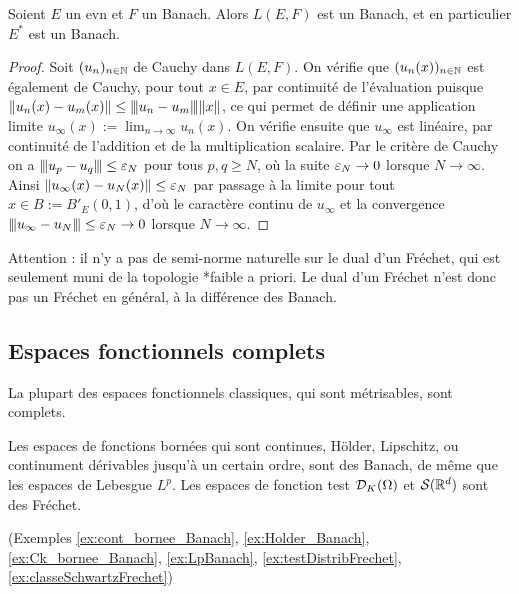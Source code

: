 \begin{proposition}
\label{prop:LEFcomplet}
%
Soient $E$ un evn et $F$ un Banach. Alors $L(E,F)$ est un Banach, et en particulier $E^*$ est un Banach. 	
\end{proposition}

\begin{proof}
	Soit $(u_n)_{n \in \mathbb{N}}$ de Cauchy dans $L(E,F)$. On vérifie que $(u_n(x))_{n \in \mathbb{N}}$ est également de Cauchy, pour tout $x \in E$, par continuité de l'évaluation puisque 
$\|u_n(x)-u_m(x)\| \leq {\left\vert\kern-0.25ex\left\vert\kern-0.25ex\left\vert u_n-u_m \right\vert\kern-0.25ex\right\vert\kern-0.25ex\right\vert} \|x\|$, 
	ce qui permet de définir une application limite $u_\infty(x) := \lim_{n\to \infty} u_n(x)$. On vérifie ensuite que $u_\infty$ est linéaire, par continuité de l'addition et de la multiplication scalaire. Par le critère de Cauchy on a ${\left\vert\kern-0.25ex\left\vert\kern-0.25ex\left\vert u_p-u_q \right\vert\kern-0.25ex\right\vert\kern-0.25ex\right\vert}\leq \varepsilon_N$ pour tous $p,q\geq N$, où la suite $\varepsilon_N \to 0$ lorsque $N \to \infty$. Ainsi $\|u_\infty(x)-u_N(x)\| \leq \varepsilon_N$ par passage à la limite pour tout $x \in B := B'_E(0,1)$, d'où le caractère continu de $u_\infty$ et la convergence ${\left\vert\kern-0.25ex\left\vert\kern-0.25ex\left\vert u_\infty-u_N \right\vert\kern-0.25ex\right\vert\kern-0.25ex\right\vert} \leq \varepsilon_N \to 0$ lorsque $N \to \infty$.
\end{proof}

Attention : il n'y a pas de semi-norme naturelle sur le dual d'un Fréchet, qui est seulement muni de la topologie *faible a priori. Le dual d'un Fréchet n'est donc pas un Fréchet en général, à la différence des Banach.

\subsection{Espaces fonctionnels complets}
\label{subsec:fctsComplets}

La plupart des espaces fonctionnels classiques, qui sont métrisables, sont complets.

\begin{retenir}
Les espaces de fonctions bornées qui sont continues, Hölder, Lipschitz, ou continument dérivables jusqu'à un certain ordre, sont des Banach, de même que les espaces de Lebesgue $L^p$. Les espaces de fonction test $\mathcal{D}_K(\Omega)$ et $\mathcal{S}(\mathbb{R}^d)$ sont des Fréchet. 

(Exemples \ref{ex:cont_bornee_Banach}, \ref{ex:Holder_Banach}, \ref{ex:Ck_bornee_Banach}, \ref{ex:LpBanach}, \ref{ex:testDistribFrechet}, \ref{ex:classeSchwartzFrechet})
\end{retenir}

